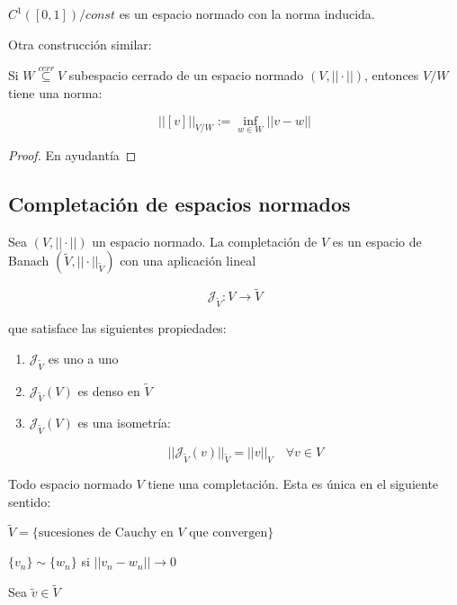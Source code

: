 $C^1([0,1])/const$ es un espacio normado con la norma inducida.

Otra construcción similar:
\begin{fproposition}
    Si $W\overset{cerr}{\subseteq}V$ subespacio cerrado de un espacio normado $(V,||\cdot||)$, entonces $V/W$ tiene una norma:

    \[||[v]||_{V/W}:=\inf_{w\in W}||v-w||\]
\end{fproposition}

\begin{proof}
    En ayudantía
\end{proof}

\subsection{Completación de espacios normados}

\begin{fdefinition}
    Sea $(V,||\cdot||)$ un espacio normado. La \color{red} completación \color{black} de $V$ es un espacio de Banach $(\tilde V,||\cdot||_{\tilde V})$ con una aplicación lineal 

    \[\mathcal{J}_{\tilde V}:V\to\tilde V\]

    que satisface las siguientes propiedades:

    \begin{enumerate}
        \item $\mathcal{J}_{\tilde V}$ es uno a uno
        \item $\mathcal{J}_{\tilde V}(V)$ es denso en $\tilde V$
        \item $\mathcal{J}_{\tilde V}(V)$ es una isometría:
        
        \[||\mathcal{J}_{\tilde V}(v)||_{\tilde V}=||v||_{V}\quad \forall v\in V\]
    \end{enumerate}
\end{fdefinition}

\begin{ftheorem}
    Todo espacio normado $V$ tiene una completación. Esta es única en el siguiente sentido:


    $\tilde V=\{\text{sucesiones de Cauchy en $V$ que convergen}\}$

    $\{v_n\}\sim\{w_n\}$ si $||v_n-w_n||\to 0$

    Sea $\tilde v\in \tilde V$ 

\end{ftheorem}


